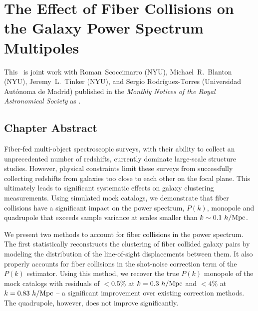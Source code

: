 \renewcommand{\chapid}{fc}
\chapter{The Effect of Fiber Collisions on the Galaxy Power Spectrum Multipoles }


This \paper\ is joint work with Roman~Scoccimarro (NYU), 
Michael~R.~Blanton (NYU), Jeremy~L.~Tinker (NYU), and Sergio Rodr\'{i}guez-Torres 
(Universidad Aut\'{o}noma de Madrid) published in the \emph{Monthly Notices of the Royal
Astronomical Society} as \cite{Hahn:2017a}. 

\newcommand{\lexp}{\mathop{\langle}}
\newcommand{\rexp}{\mathop{\rangle}}
\newcommand{\rexpc}{\mathop{\rangle_c}}
\def\k{{\hbox{\BF k}}}
\def\x{{\hbox{\BF x}}}
\def\r{{\hbox{\BF r}}}
\def\s{{\hbox{\BF s}}}
\def\la{\mathrel{\mathpalette\fun <}}
\def\ga{\mathrel{\mathpalette\fun >}}
\def\fun#1#2{\lower3.6pt\vbox{\baselineskip0pt\lineskip.9pt
\ialign{$\mathsurround=0pt#1\hfill##\hfil$\crcr#2\crcr\sim\crcr}}}


\section{Chapter Abstract}
\qquad Fiber-fed multi-object spectroscopic surveys, with their ability to collect an unprecedented number of redshifts, currently dominate large-scale structure studies. However, physical constraints limit these surveys from successfully collecting redshifts from galaxies too close to each other on the focal plane. This ultimately leads to significant systematic effects on galaxy clustering measurements. Using simulated mock catalogs, we demonstrate that fiber collisions have a significant impact on the power spectrum, $P(k)$, monopole and quadrupole that exceeds sample variance at scales smaller than $k\sim0.1~h/{\rm Mpc}$.

\qquad We present two methods to account for fiber collisions in the power spectrum. The first statistically reconstructs the clustering of fiber collided galaxy pairs by modeling the distribution of the line-of-sight displacements between them. It also properly accounts for fiber collisions in the shot-noise correction term of the $P(k)$ estimator. Using this method, we recover the true $P(k)$ monopole of the mock catalogs with residuals of $<0.5\%$ at $k=0.3~h/{\rm Mpc}$ and $<4\%$ at $k=0.83~h/{\rm Mpc}$ -- a significant improvement over existing correction methods. The quadrupole, however, does not improve significantly.

